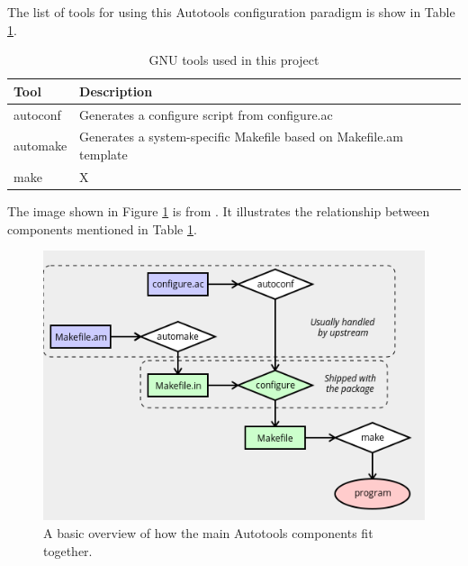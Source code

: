 \justifying
The list of tools for using this Autotools configuration paradigm is show in Table \ref{Autotools}.
\vspace{2mm}

\begin{table}[ht]
	\centering
	\begin{tabular}{|l|l|}\hline
		Tool & Description \\\hline
		autoconf & Generates a configure script from configure.ac   \\\hline
		automake & Generates a system-specific Makefile based on Makefile.am template    \\\hline
		make  &   X    \\\hline
	\end{tabular}
	\caption{GNU tools used in this project}
	\label{Autotools}
\end{table}
\vspace{2mm}

\justifying
The image shown in Figure \ref{diagram} is from \cite{autobasics}.
It illustrates the relationship between components mentioned in Table \ref{Autotools}.
\vspace{2mm}

\begin{figure}[ht]
	\includegraphics[width=12cm]{images/diagram.png}
	\caption{A basic overview of how the main Autotools components fit together.}
	\label{diagram}
\end{figure}
\vspace{2mm}


\clearpage
\begin{versionhistory}
\end{versionhistory}

\clearpage





